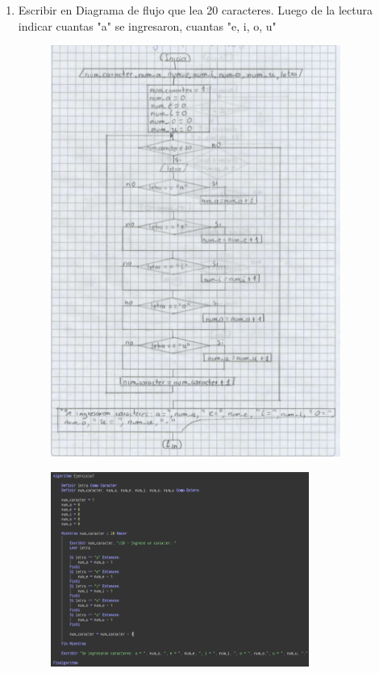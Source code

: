 \documentclass[12pt]{article}
\begin{document}
\begin{enumerate}
            \newpage
            \item Escribir en Diagrama de flujo que lea 20 caracteres. Luego de la lectura indicar cuantas "a" se ingresaron, cuantas "e, i, o, u"

                \begin{figure}[!h]
                    \centering
                    \includegraphics[width=0.9\textwidth]{Img/DF_ej7.png}
                \end{figure}

                \newpage
                \begin{figure}[!h]
                    \centering
                    \includegraphics[width=0.8\textwidth]{Img/Cod_ej7.png}
                \end{figure}


\end{enumerate}
\end{document}
